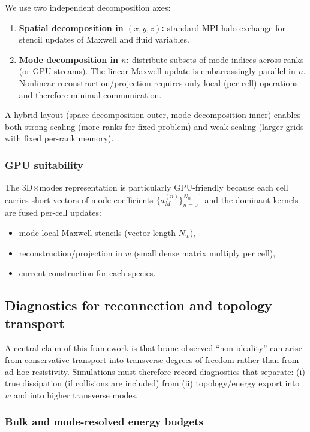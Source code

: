 \documentclass[11pt]{article}
\begin{document}
We use two independent decomposition axes:
\begin{enumerate}[leftmargin=1.6em]
\item \textbf{Spatial decomposition in \((x,y,z)\):} standard MPI halo exchange for
stencil updates of Maxwell and fluid variables.
\item \textbf{Mode decomposition in \(n\):} distribute subsets of mode indices across
ranks (or GPU streams). The linear Maxwell update is embarrassingly parallel in \(n\).
Nonlinear reconstruction/projection requires only local (per-cell) operations and
therefore minimal communication.
\end{enumerate}
A hybrid layout (space decomposition outer, mode decomposition inner) enables both
strong scaling (more ranks for fixed problem) and weak scaling (larger grids with
fixed per-rank memory).

\subsubsection*{GPU suitability}

The 3D\(\times\)modes representation is particularly GPU-friendly because each cell
carries short vectors of mode coefficients \(\{a_M^{(n)}\}_{n=0}^{N_w-1}\) and the
dominant kernels are fused per-cell updates:
\begin{itemize}[leftmargin=1.7em]
\item mode-local Maxwell stencils (vector length \(N_w\)),
\item reconstruction/projection in \(w\) (small dense matrix multiply per cell),
\item current construction for each species.
\end{itemize}

\subsection{Diagnostics for reconnection and topology transport}
\label{sec:diagnostics}

A central claim of this framework is that brane-observed ``non-ideality'' can arise
from conservative transport into transverse degrees of freedom rather than from
ad hoc resistivity. Simulations must therefore record diagnostics that separate:
(i) true dissipation (if collisions are included) from (ii) topology/energy export
into \(w\) and into higher transverse modes.

\subsubsection*{Bulk and mode-resolved energy budgets}
\end{document}
